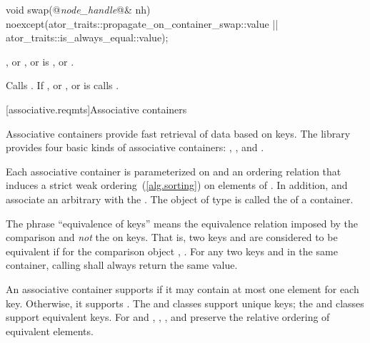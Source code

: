 \begin{itemdecl}
void swap(@\textit{node_handle}@& nh)
  noexcept(ator_traits::propagate_on_container_swap::value ||
           ator_traits::is_always_equal::value);
\end{itemdecl}

\begin{itemdescr}
\pnum
\requires {}, or , or
 is ,
or .

\pnum
\effects Calls . If , or
, or 
is  calls .
\end{itemdescr}


[associative.reqmts]{Associative containers}

\pnum
Associative containers provide fast retrieval of data based on keys.
The library provides four basic kinds of associative containers:
,
,
and
.

\pnum
Each associative container is parameterized on
and an ordering relation
that induces a strict weak ordering~(\ref{alg.sorting}) on
elements of
.
In addition,
and
associate an arbitrary 
with the
.
The object of type
is called the
of a container.

\pnum
The phrase ``equivalence of keys'' means the equivalence relation imposed by the
comparison and
\textit{not}
the
on keys.
That is, two keys
and
are considered to be equivalent if for the
comparison object
,
.
For any two keys
and
in the same container, calling
shall always return the same value.

\pnum
An associative container supports  if it may contain at
most one element for each key. Otherwise, it supports .
The  and  classes support unique keys; the 
and  classes support equivalent keys.
For  and ,
, , and  preserve the relative ordering
of equivalent elements.

